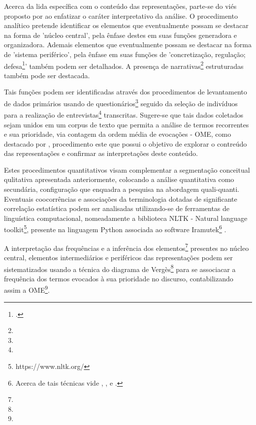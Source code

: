 \documentclass[
  12pt,       %
  openright,      %
  twoside,      %
  a4paper,      %
  english,      %
  french,       %
  spanish,      %
  brazil        %
  ]{abntex2}
\begin{document}
Acerca da lida específica com o conteúdo das representações, parte-se do viés proposto por  ao enfatizar o caráter interpretativo da análise. O procedimento analítico pretende identificar os elementos que eventualmente possam se destacar na forma de 'núcleo central', pela ênfase destes em suas funções generadora e organizadora. Ademais elementos que eventualmente possam se destacar na forma de 'sistema periférico', pela ênfase em suas funções de 'concretização, regulação; defesa\footnote{.}' também podem ser detalhados. A presença de narrativas\footnote{} estruturadas também pode ser destacada.

Tais funções podem ser identificadas através dos procedimentos de levantamento de dados primários usando de questionários\footnote{} seguido da seleção de indivíduos para a realização de entrevistas\footnote{} transcritas. Sugere-se que tais dados coletados sejam unidos em um corpus de texto que permita a análise de termos recorrentes e sua prioridade, via contagem da ordem média de evocações - OME, como destacado por , procedimento este que possui o objetivo de explorar o contreúdo das representações e confirmar as interpretações deste conteúdo.

Estes procedimentos quantitativos visam complementar a segmentação conceitual qulitativa apresentada anteriormente, colocando a análise quantitativa como secundária, configuração que enquadra a pesquisa na abordagem quali-quanti. Eventuais coocorrências e associações da terminologia dotadas de significante correlação estatística podem ser analisadas utilizando-se de ferramentas de linguística computacional, nomeadamente a biblioteca NLTK - Natural language toolkit\footnote{https://www.nltk.org/}, presente na linguagem Python associada ao software Iramutek\footnote{Acerca de tais técnicas vide , ,  e .}
.

A interpretação das frequências e a inferência dos elementos\footnote{} presentes no núcleo central, elementos intermediários e periféricos das representações podem ser sistematizados usando a técnica do diagrama de Vergès\footnote{} para se associacar a frequência dos termos evocados à sua prioridade no discurso, contabilizando assim a OME\footnote{}.
\end{document}
